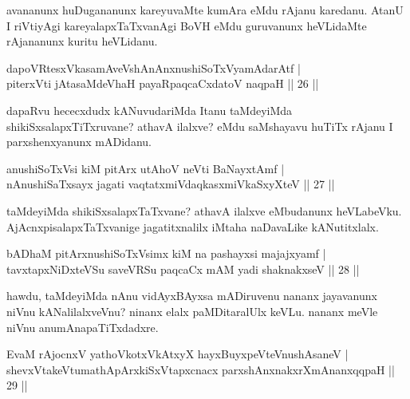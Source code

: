 \begin{artha}
avananunx huDugananunx kareyuvaMte kumAra eMdu rAjanu karedanu. AtanU 
I riVtiyAgi kareyalapxTaTxvanAgi BoVH eMdu guruvanunx heVLidaMte 
rAjananunx kuritu heVLidanu.
\end{artha}


\begin{shl}
dapoVRtesxVkasamAveVshAnAnxnushiSoTxV\s yamAdarAtf | \\
piterxVti jAtasaMdeVhaH payaRpaqcaCxdatoV naqpaH \hfill|| 26 || 
\end{shl}

\begin{artha}
dapaRvu hececxdudx kANuvudariMda Itanu taMdeyiMda shikiSxsalapxTiTxruvane? athavA ilalxve? eMdu saMshayavu huTiTx rAjanu I parxshenxyanunx mADidanu.
\end{artha}

\begin{shl}
anushiSoTxV\s si kiM pitArx utAhoV neVti BaNayxtAmf | \\
nAnushiSaTxsayx jagati vaqtatxmiVdaqkasxmiVkaSxyXteV \hfill|| 27 || 
\end{shl}

\begin{artha}
taMdeyiMda shikiSxsalapxTaTxvane? athavA ilalxve eMbudanunx heVLabeVku. AjAcnxpisalapxTaTxvanige jagatitxnalilx iMtaha naDavaLike kANutitxlalx.
\end{artha}


\begin{shl}
bADhaM pitArx\s nushiSoTxV\s simx kiM na pashayxsi majajxyamf | \\
tavxtapxNiDxteVSu saveVRSu paqcaCx mAM yadi shaknakxseV \hfill|| 28 || 
\end{shl}

\begin{artha}
hawdu, taMdeyiMda nAnu vidAyxBAyxsa mADiruvenu nananx jayavanunx niVnu 
kANalilalxveVnu? ninanx elalx paMDitaralUlx keVLu. nananx meVle niVnu 
anumAnapaTiTxdadxre.
\end{artha}

\begin{shl}
EvaM rAjocnxV yathoVkotxVkAtxyX hayxBuyxpeVteV\s nushAsaneV | \\
shevxVtakeVtumathApArxkiSxVtapxcnacx parxshAnxnakxrXmAnanxqqpaH \hfill|| 29 || 
\end{shl}

